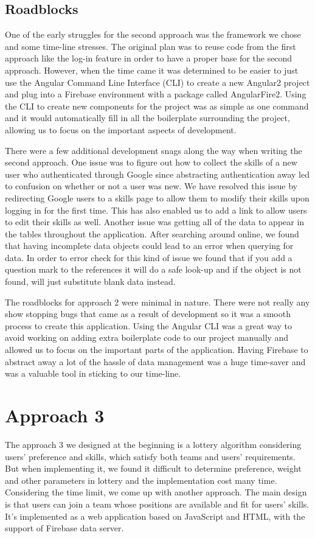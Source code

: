\documentclass[conference]{IEEEtran}
\begin{document}
\subsection{Roadblocks}

One of the early struggles for the second approach was the framework we chose and some time-line stresses. The original plan was to reuse code from the first approach like the log-in feature in order to have a proper base for the second approach. However, when the time came it was determined to be easier to just use the Angular Command Line Interface (CLI) to create a new Angular2 project and plug into a Firebase environment with a package called AngularFire2. Using the CLI to create new components for the project was as simple as one command and it would automatically fill in all the boilerplate surrounding the project, allowing us to focus on the important aspects of development. 

There were a few additional development snags along the way when writing the second approach. One issue was to figure out how to collect the skills of a new user who authenticated through Google since abstracting authentication away led to confusion on whether or not a user was new. We have resolved this issue by redirecting Google users to a skills page to allow them to modify their skills upon logging in for the first time. This has also enabled us to add a link to allow users to edit their skills as well. Another issue was getting all of the data to appear in the tables throughout the application. After searching around online, we found that having incomplete data objects could lead to an error when querying for data. In order to error check for this kind of issue we found that if you add a question mark to the references it will do a safe look-up and if the object is not found, will just substitute blank data instead. 

The roadblocks for approach 2 were minimal in nature. There were not really any show stopping bugs that came as a result of development so it was a smooth process to create this application. Using the Angular CLI was a great way to avoid working on adding extra boilerplate code to our project manually and allowed us to focus on the important parts of the application. Having Firebase to abstract away a lot of the hassle of data management was a huge time-saver and was a valuable tool in sticking to our time-line. 

\section{Approach 3}
The approach 3 we designed at the beginning is a lottery algorithm considering users' preference and skills, which satisfy both teams and users' requirements. But when implementing it, we found it difficult to determine preference, weight and other parameters in lottery and the implementation cost many time. Considering the time limit, we come up with another approach. The main design is that users can join a team whose positions are available and fit for users' skills. It's implemented as a web application based on JavaScript and HTML, with the support of Firebase data server.
\end{document}

